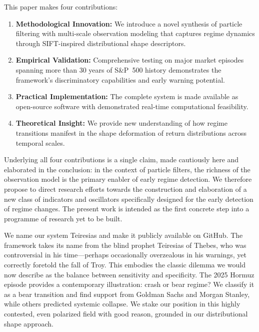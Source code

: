 \documentclass[11pt]{article}
\begin{document}
This paper makes four contributions:

\begin{enumerate}
\item \textbf{Methodological Innovation:} We introduce a novel synthesis
of particle filtering with multi-scale observation modeling that
captures regime dynamics through SIFT-inspired distributional shape
descriptors.
\item \textbf{Empirical Validation:} Comprehensive testing on major
market episodes spanning more than 30 years of S\&P~500 history
demonstrates the framework's discriminatory capabilities and early
warning potential.
\item \textbf{Practical Implementation:} The complete system is made
available as open-source software with demonstrated real-time
computational feasibility.
\item \textbf{Theoretical Insight:} We provide new understanding of how
regime transitions manifest in the shape deformation of return
distributions across temporal scales.
\end{enumerate}

Underlying all four contributions is a single claim, made cautiously
here and elaborated in the conclusion: in the context of particle
filters, the richness of the observation model is the primary enabler of
early regime detection. We therefore propose to direct research efforts
towards the construction and elaboration of a new class of indicators
and oscillators specifically designed for the early detection of regime
changes. The present work is intended as the first concrete step into a
programme of research yet to be built.

We name our system Teiresias and make it publicly available on GitHub.
The framework takes its name from the blind prophet Teiresias of Thebes,
who was controversial in his time---perhaps occasionally overzealous in
his warnings, yet correctly foretold the fall of Troy. This embodies the
classic dilemma we would now describe as the balance between sensitivity
and specificity. The 2025 Hormuz episode provides a contemporary
illustration: crash or bear regime? We classify it as a bear transition
and find support from Goldman Sachs and Morgan Stanley, while others
predicted systemic collapse. We stake our position in this highly
contested, even polarized field with good reason, grounded in our
distributional shape approach.
\end{document}

